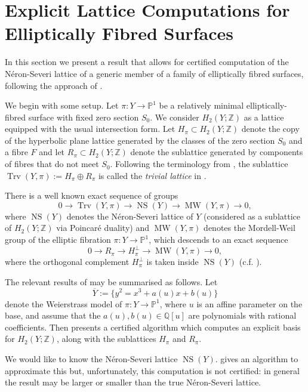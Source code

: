 \documentclass[a4paper]{amsart}
\theoremstyle{definition}
\theoremstyle{plain}
\theoremstyle{remark}
\newcommand{\bP}{\mathbb{P}}
\newcommand{\bQ}{\mathbb{Q}}
\newcommand{\bZ}{\mathbb{Z}}
\DeclareMathOperator{\MW}{MW}
\DeclareMathOperator{\NS}{NS}
\DeclareMathOperator{\Trv}{Trv}
\numberwithin{figure}{section}
\numberwithin{table}{section}
\begin{document}
\section{Explicit Lattice Computations for Elliptically Fibred Surfaces} \label{sec:ellipticfibrationcomputations}

In this section we present a result that allows for certified computation of the N\'{e}ron-Severi lattice of a generic member of a family of elliptically fibred surfaces, following the approach of \cite{snahlpcesp1}.

We begin with some setup. Let $\pi\colon Y \to \bP^1$ be a relatively minimal elliptically-fibred surface with fixed zero section $S_0$. We consider $H_2(Y;\bZ)$ as a lattice equipped with the usual intersection form. Let $H_{\pi} \subset H_2(Y;\bZ)$ denote the copy of the hyperbolic plane lattice generated by the classes of the zero section $S_0$ and a fibre $F$ and let $R_{\pi} \subset H_2(Y;\bZ)$ denote the sublattice generated by components of fibres that do not meet $S_0$. Following the terminology from \cite{es}, the sublattice $\Trv(Y,\pi) := H_{\pi} \oplus R_{\pi}$ is called the \emph{trivial lattice} in \cite[Definition 7]{snahlpcesp1}.

There is a well known exact sequence of groups
\begin{equation} \label{eq:NSsequence} 0 \longrightarrow \Trv(Y,\pi) \longrightarrow \NS(Y) \longrightarrow \MW(Y,\pi) \longrightarrow 0,\end{equation}
where $\NS(Y)$ denotes the N\'{e}ron-Severi lattice of $Y$ (considered as a sublattice of $H_2(Y;\bZ)$ via Poincar\'{e} duality) and $\MW(Y,\pi)$ denotes the Mordell-Weil group of the elliptic fibration $\pi\colon Y \to \bP^1$, which descends to an exact sequence
\[0 \longrightarrow R_{\pi} \longrightarrow H_{\pi}^{\perp} \longrightarrow \MW(Y,\pi) \longrightarrow 0,\]
where the orthogonal complement $H_{\pi}^{\perp}$ is taken inside $\NS(Y)$ (c.f. \cite[Section VII.2]{btes}).

The relevant results of \cite{snahlpcesp1} may be summarised as follows. Let 
\[\overline{Y} := \{y^2 = x^3 + a(u)x + b(u)\}\]
denote the Weierstrass model of $\pi \colon Y \to \bP^1$, where $u$ is an affine parameter on the base, and assume that the $a(u), b(u) \in \bQ[u]$ are polynomials with rational coefficients. Then \cite{snahlpcesp1} presents a certified algorithm which computes an explicit basis for $H_2(Y;\bZ)$, along with the sublattices $H_{\pi}$ and $R_{\pi}$.

We would like to know the N\'{e}ron-Severi lattice $\NS(Y)$. \cite[Section 4.1]{snahlpcesp1} gives an algorithm to approximate this but, unfortunately, this computation is not certified: in general the result may be larger or smaller than the true N\'{e}ron-Severi lattice.
\end{document}
